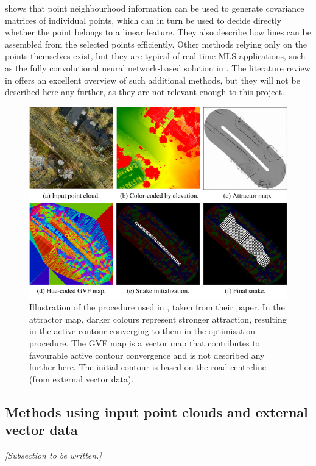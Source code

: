 \cite{gross_thoennessen_2006} shows that point neighbourhood information can be used to generate covariance matrices of individual points, which can in turn be used to decide directly whether the point belongs to a linear feature. They also describe how lines can be assembled from the selected points efficiently. Other methods relying only on the points themselves exist, but they are typical of real-time MLS applications, such as the fully convolutional neural network-based solution in \cite{caltagirone_etal_2017}. The literature review in \cite{yang_etal_2013} offers an excellent overview of such additional methods, but they will not be described here any further, as they are not relevant enough to this project.

\begin{figure}[h]
    \centering
    \includegraphics[width=0.75\linewidth]{p2/figs/boyko_funkahuser_2011_01.png} 
    \caption{Illustration of the procedure used in \cite{boyko_funkhauser_2011}, taken from their paper. In the attractor map, darker colours represent stronger attraction, resulting in the active contour converging to them in the optimisation procedure. The GVF map is a vector map that contributes to favourable active contour convergence and is not described any further here. The initial contour is based on the road centreline (from external vector data).}
    \label{fig:activecontouroptimisation}
\end{figure}

\subsection{Methods using input point clouds and external vector data}
\label{sub:lidaraccuracy_external}

\textit{[Subsection to be written.]}

